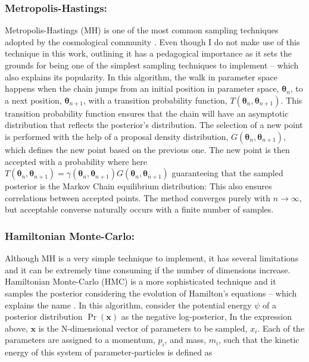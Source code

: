 \subsubsection{Metropolis-Hastings:}
Metropolis-Hastings (MH) is one of the most common sampling techniques adopted by the cosmological community \citep{2002CosmoMC}. Even though I do not make use of this technique in this work, outlining it has a pedagogical importance as it sets the grounds for being one of the simplest sampling techniques to implement -- which also explains its popularity. In this algorithm, the walk in parameter space happens when the chain jumps from an initial position in parameter space, $\bm{\theta}_n$, to a next position, $\bm{\theta}_{n+1}$, with a transition probability function, $T(\bm{\theta}_n,\bm{\theta}_{n+1})$. This transition probability function ensures that the chain will have an asymptotic distribution that reflects the posterior's distribution. The selection of a new point is performed with the help of a proposal density distribution, $G(\bm{\theta}_n, \bm{\theta}_{n+1})$, which defines the new point based on the previous one. The new point is then accepted with a probability
where here $T(\bm{\theta}_n,\bm{\theta}_{n+1}) = \gamma(\bm{\theta}_n, \bm{\theta}_{n+1})G(\bm{\theta}_n, \bm{\theta}_{n+1})$ guaranteeing that the sampled posterior is the Markov Chain equilibrium distribution:
This also ensures correlations between accepted points. The method converges purely with $n\rightarrow \infty$, but acceptable converse naturally occurs with a finite number of samples.

\subsubsection{Hamiltonian Monte-Carlo:}
Although MH is a very simple technique to implement, it has several limitations and it can be extremely time consuming if the number of dimensions increase. Hamiltonian Monte-Carlo (HMC) is a more sophisticated technique and it samples the posterior considering the evolution of Hamilton's equations -- which explains the name \citep{Taylor2008}. In this algorithm, consider the potential energy $\psi$ of a posterior distribution $\Pr(\bm{x})$ as the negative log-posterior,
In the expression above, $\bm{x}$ is the N-dimensional vector of parameters to be sampled, $x_i$. Each of the parameters are assigned to a momentum, $p_i$, and mass, $m_i$, such that the kinetic energy of this system of parameter-particles is defined as

